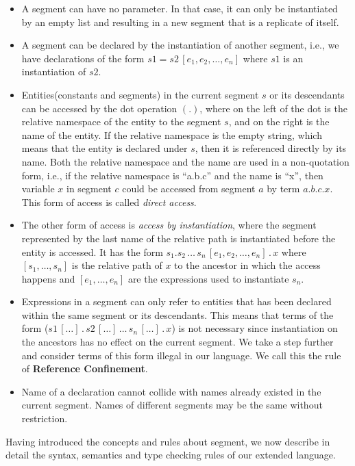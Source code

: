 \begin{definition}[Segment]
\begin{itemize}
  \item A segment can have no parameter. In that case, it can only be instantiated by an empty list and resulting in a new segment that is a replicate of itself.
  \item A segment can be declared by the instantiation of another segment, i.e., we have declarations of the form $s1 = s2\,[e_1, e_2, \dots, e_n]$ where $s1$ is an instantiation of $s2$.
  \item Entities(constants and segments) in the current segment $s$ or its descendants can be accessed by the dot operation $(.)$, where on the left of the dot is the relative namespace of the entity to the segment $s$, and on the right is the name of the entity. If the relative namespace is the empty string, which means that the entity is declared under $s$, then it is referenced directly by its name. Both the relative namespace and the name are used in a non-quotation form, i.e., if the relative namespace is ``a.b.c'' and the name is ``x'', then variable $x$ in segment $c$ could be accessed from segment $a$ by term $a.b.c.x$. This form of access is called \emph{direct access}. 
  \item The other form of access is \emph{access by instantiation}, where the segment represented by the last name of the relative path is instantiated before the entity is accessed. It has the form $s_1.s_2\,\dots\,s_n\,[e_1,e_2,\dots,e_n]\,.\,x$ where $[s_1,\dots,s_n]$ is the relative path of $x$ to the ancestor in which the access happens and $[e_1,\dots,e_n]$ are the expressions used to instantiate $s_n$.
  \item Expressions in a segment can only refer to entities that has been declared within the same segment or its descendants. This means that terms of the form ($s1\,[\dots]\,.\,s2\,[\dots]\,\dots\,s_n\,[\dots]\,.\,x$) is not necessary since instantiation on the ancestors has no effect on the current segment. We take a step further and consider terms of this form illegal in our language. We call this the rule of \textbf{Reference Confinement}.
  \item Name of a declaration cannot collide with names already existed in the current segment. Names of different segments may be the same without restriction.  
  \end{itemize}
\end{definition}

Having introduced the concepts and rules about segment, we now describe in detail the syntax, semantics and type checking rules of our extended language.

